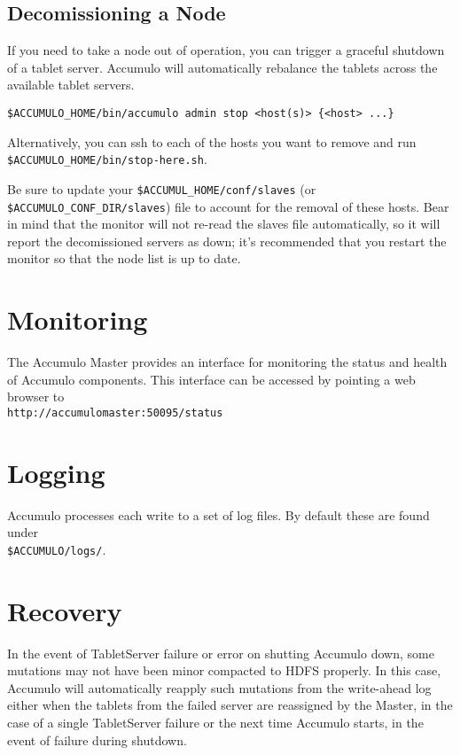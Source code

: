 \subsection{Decomissioning a Node}

If you need to take a node out of operation, you can trigger a graceful shutdown of a tablet 
server. Accumulo will automatically rebalance the tablets across the available tablet servers.

\begin{verbatim}
$ACCUMULO_HOME/bin/accumulo admin stop <host(s)> {<host> ...}
\end{verbatim}

Alternatively, you can ssh to each of the hosts you want to remove and run 
\texttt{\$ACCUMULO\_HOME/bin/stop-here.sh}.

Be sure to update your \texttt{\$ACCUMUL\_HOME/conf/slaves} (or \texttt{\$ACCUMULO\_CONF\_DIR/slaves}) file to 
account for the removal of these hosts. Bear in mind that the monitor will not re-read the 
slaves file automatically, so it will report the decomissioned servers as down; it's 
recommended that you restart the monitor so that the node list is up to date.

\section{Monitoring}

The Accumulo Master provides an interface for monitoring the status and health of
Accumulo components. This interface can be accessed by pointing a web browser to\\
\texttt{http://accumulomaster:50095/status}

\section{Logging}
Accumulo processes each write to a set of log files. By default these are found under\\
\texttt{\$ACCUMULO/logs/}.

\section{Recovery}

In the event of TabletServer failure or error on shutting Accumulo down, some
mutations may not have been minor compacted to HDFS properly. In this case,
Accumulo will automatically reapply such mutations from the write-ahead log
either when the tablets from the failed server are reassigned by the Master, in the
case of a single TabletServer failure or the next time Accumulo starts, in the event of
failure during shutdown.

